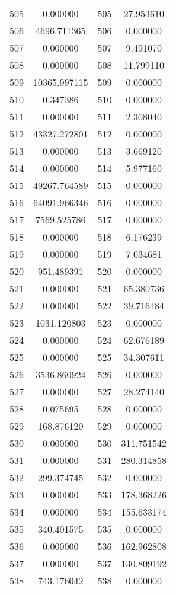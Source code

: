 \documentclass[12pt]{article}
\begin{document}
\begin{longtable}{@{}cccc@{}}
505 & 0.000000 & 505 & 27.953610 \\
506 & 4696.711365 & 506 & 0.000000 \\
507 & 0.000000 & 507 & 9.491070 \\
508 & 0.000000 & 508 & 11.799110 \\
509 & 10365.997115 & 509 & 0.000000 \\
510 & 0.347386 & 510 & 0.000000 \\
511 & 0.000000 & 511 & 2.308040 \\
512 & 43327.272801 & 512 & 0.000000 \\
513 & 0.000000 & 513 & 3.669120 \\
514 & 0.000000 & 514 & 5.977160 \\
515 & 49267.764589 & 515 & 0.000000 \\
516 & 64091.966346 & 516 & 0.000000 \\
517 & 7569.525786 & 517 & 0.000000 \\
518 & 0.000000 & 518 & 6.176239 \\
519 & 0.000000 & 519 & 7.034681 \\
520 & 951.489391 & 520 & 0.000000 \\
521 & 0.000000 & 521 & 65.380736 \\
522 & 0.000000 & 522 & 39.716484 \\
523 & 1031.120803 & 523 & 0.000000 \\
524 & 0.000000 & 524 & 62.676189 \\
525 & 0.000000 & 525 & 34.307611 \\
526 & 3536.860924 & 526 & 0.000000 \\
527 & 0.000000 & 527 & 28.274140 \\
528 & 0.075695 & 528 & 0.000000 \\
529 & 168.876120 & 529 & 0.000000 \\
530 & 0.000000 & 530 & 311.751542 \\
531 & 0.000000 & 531 & 280.314858 \\
532 & 299.374745 & 532 & 0.000000 \\
533 & 0.000000 & 533 & 178.368226 \\
534 & 0.000000 & 534 & 155.633174 \\
535 & 340.401575 & 535 & 0.000000 \\
536 & 0.000000 & 536 & 162.962808 \\
537 & 0.000000 & 537 & 130.809192 \\
538 & 743.176042 & 538 & 0.000000 \\

\end{longtable}
\end{document}
